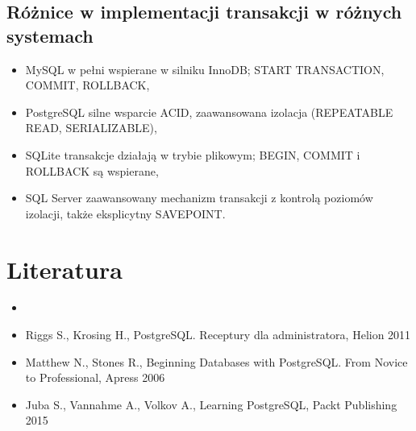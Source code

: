 \documentclass[a4paper,11pt,polish]{sphinxmanual}
\begin{document}
\subsection{Różnice w implementacji transakcji w różnych systemach}
\label{\detokenize{Kontrola_i_konserwacja/kontrola_i_konserwacja:roznice-w-implementacji-transakcji-w-roznych-systemach}}\begin{itemize}
\item {} 
\sphinxAtStartPar
MySQL \sphinxhyphen{} w pełni wspierane w silniku InnoDB; START TRANSACTION, COMMIT, ROLLBACK,

\item {} 
\sphinxAtStartPar
PostgreSQL \sphinxhyphen{} silne wsparcie ACID, zaawansowana izolacja (REPEATABLE READ, SERIALIZABLE),

\item {} 
\sphinxAtStartPar
SQLite \sphinxhyphen{} transakcje działają w trybie plikowym; BEGIN, COMMIT i ROLLBACK są wspierane,

\item {} 
\sphinxAtStartPar
SQL Server \sphinxhyphen{} zaawansowany mechanizm transakcji z kontrolą poziomów izolacji, także eksplicytny SAVEPOINT.

\end{itemize}


\section{Literatura}
\label{\detokenize{Kontrola_i_konserwacja/kontrola_i_konserwacja:literatura}}\begin{itemize}
\item {} 
\sphinxAtStartPar
{}

\item {} 
\sphinxAtStartPar
Riggs S., Krosing H., PostgreSQL. Receptury dla administratora, Helion 2011

\item {} 
\sphinxAtStartPar
Matthew N., Stones R., Beginning Databases with PostgreSQL. From Novice to Professional, Apress 2006

\item {} 
\sphinxAtStartPar
Juba S., Vannahme A., Volkov A., Learning PostgreSQL, Packt Publishing 2015

\end{itemize}

\sphinxstepscope
\end{document}
